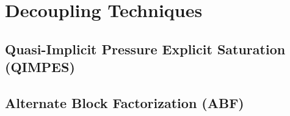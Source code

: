 \section{Decoupling Techniques}

\subsection{Quasi-Implicit Pressure Explicit Saturation (QIMPES)}

\subsection{Alternate Block Factorization (ABF)}

